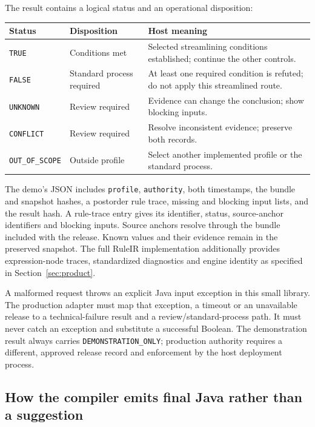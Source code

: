 The result contains a logical status and an operational disposition:
\begin{center}\small
\begin{tabularx}{\textwidth}{P{0.18\textwidth}P{0.34\textwidth}Y}
\toprule Status & Disposition & Host meaning \\\midrule
\texttt{TRUE} & Conditions met & Selected streamlining conditions established; continue the other controls.\\
\texttt{FALSE} & Standard process required & At least one required condition is refuted; do not apply this streamlined route.\\
\texttt{UNKNOWN} & Review required & Evidence can change the conclusion; show blocking inputs.\\
\texttt{CONFLICT} & Review required & Resolve inconsistent evidence; preserve both records.\\
\texttt{OUT\_OF\_SCOPE} & Outside profile & Select another implemented profile or the standard process.\\
\bottomrule
\end{tabularx}
\end{center}
The demo's JSON includes \texttt{profile}, \texttt{authority}, both timestamps,
the bundle and snapshot hashes, a postorder rule trace, missing and blocking
input lists, and the result hash. A rule-trace entry gives its identifier,
status, source-anchor identifiers and blocking inputs. Source anchors resolve
through the bundle included with the release. Known values and their evidence
remain in the preserved snapshot. The full RuleIR implementation additionally
provides expression-node traces, standardized diagnostics and engine identity
as specified in Section~\ref{sec:product}.

A malformed request throws an explicit Java input exception in this small
library. The production adapter must map that exception, a timeout or an
unavailable release to a technical-failure result and a review/standard-process
path. It must never catch an exception and substitute a successful Boolean.
The demonstration result always carries \texttt{DEMONSTRATION\_ONLY}; production
authority requires a different, approved release record and enforcement by the
host deployment process.

\subsection{How the compiler emits final Java rather than a suggestion}

